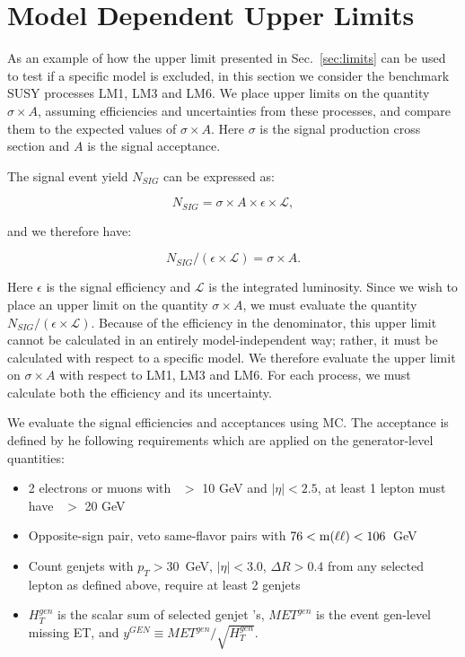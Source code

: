 \section{Model Dependent Upper Limits}
\label{sec:sigmalimit}

As an example of how the upper limit presented in Sec.~\ref{sec:limits} can be
used to test if a specific model is excluded, in this section we consider the benchmark
SUSY processes LM1, LM3 and LM6.
We place upper limits on the quantity $\sigma \times A$,
assuming efficiencies and uncertainties from these processes, and compare them to 
the expected values of $\sigma \times A$.
Here $\sigma$ is the signal production cross section and $A$ is the signal acceptance.

The signal event yield $N_{SIG}$ can be expressed as:

\begin{equation}
N_{SIG} = \sigma \times A \times \epsilon \times \mathcal{L},
\end{equation}

and we therefore have:

\begin{equation}
N_{SIG}/( \epsilon \times \mathcal{L}) = \sigma \times A.
\end{equation}

Here  $\epsilon$ is the signal efficiency and $\mathcal{L}$ is the integrated luminosity. 
Since we wish to place an upper limit on the quantity $\sigma \times A$, we must evaluate
the quantity $N_{SIG}/(\epsilon \times \mathcal{L})$.  Because of the efficiency
in the denominator, this upper limit cannot be calculated in an entirely model-independent
way; rather, it must be calculated with respect to a specific model. We therefore evaluate
the upper limit on $\sigma \times A$ with respect to LM1, LM3 and LM6.  
For each process, we must calculate both the efficiency and its uncertainty.

We evaluate the signal efficiencies and acceptances using MC. The acceptance is defined by he
following requirements which are applied on the generator-level quantities:

\begin{itemize}
\item 2 electrons or muons with \pt\ $>$ 10 GeV and $|\eta|<2.5$, at least 1 lepton must have \pt\ $>$ 20 GeV
\item Opposite-sign pair, veto same-flavor pairs with $76 < \rm{m(\ell\ell)} < 106$~GeV
\item Count genjets with $p_T > 30$~GeV, $|\eta|<3.0$, $\Delta R > 0.4$ from any selected lepton as defined above, require at least 2 genjets
\item $H_{T}^{gen}$ is the scalar sum of selected genjet \pt's, $MET^{gen}$ is the event gen-level missing ET, and $y^{GEN} \equiv MET^{gen}/\sqrt{H_{T}^{gen}}$.
\end{itemize}

